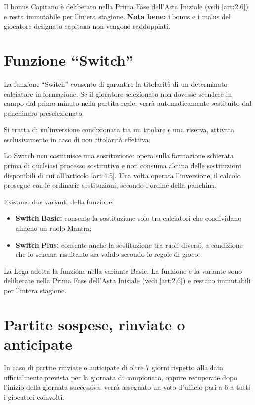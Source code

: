 Il bonus Capitano è deliberato nella Prima Fase dell'Asta Iniziale (vedi \ref{art:2.6}) e resta immutabile per l'intera stagione.  
\textbf{Nota bene:} i bonus e i malus del giocatore designato capitano non vengono raddoppiati.

\section{Funzione “Switch”}
\label{art:5.6}

La funzione “Switch” consente di garantire la titolarità di un determinato calciatore in formazione. Se il giocatore selezionato non dovesse scendere in campo dal primo minuto nella partita reale, verrà automaticamente sostituito dal panchinaro preselezionato.

Si tratta di un'inversione condizionata tra un titolare e una riserva, attivata esclusivamente in caso di non titolarità effettiva.

Lo Switch non costituisce una sostituzione: opera sulla formazione schierata prima di qualsiasi processo sostitutivo e non consuma alcuna delle sostituzioni disponibili di cui all'articolo \ref{art:4.5}. Una volta operata l'inversione, il calcolo prosegue con le ordinarie sostituzioni, secondo l'ordine della panchina.

Esistono due varianti della funzione:

\begin{itemize}
    \item \textbf{Switch Basic:} consente la sostituzione solo tra calciatori che condividano almeno un ruolo Mantra;
    \item \textbf{Switch Plus:} consente anche la sostituzione tra ruoli diversi, a condizione che lo schema risultante sia valido secondo le regole di gioco.
\end{itemize}

La Lega adotta la funzione nella variante Basic. La funzione e la variante sono deliberate nella Prima Fase dell'Asta Iniziale (vedi \ref{art:2.6}) e restano immutabili per l'intera stagione.

\section{Partite sospese, rinviate o anticipate}
\label{art:5.7}

In caso di partite rinviate o anticipate di oltre 7 giorni rispetto alla data ufficialmente prevista per la giornata di campionato, oppure recuperate dopo l'inizio della giornata successiva, verrà assegnato un voto d'ufficio pari a 6 a tutti i giocatori coinvolti.

